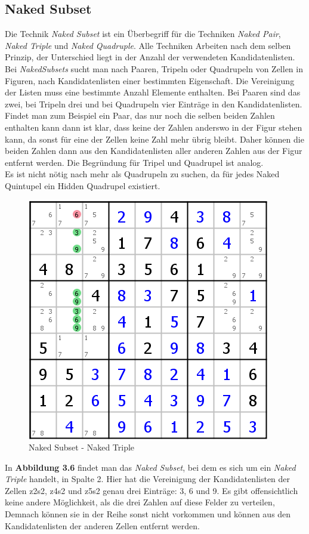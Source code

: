 \newpage
\subsection{Naked Subset}
Die Technik \textit{Naked Subset} ist ein Überbegriff für die Techniken \textit{Naked Pair}, \textit{Naked Triple} und \textit{Naked Quadruple}. Alle Techniken Arbeiten nach dem selben Prinzip, der Unterschied liegt in der Anzahl der verwendeten Kandidatenlisten. Bei \textit{NakedSubsets} sucht man nach Paaren, Tripeln oder Quadrupeln von Zellen in Figuren, nach Kandidatenlisten einer bestimmten Eigenschaft. Die Vereinigung der Listen muss eine bestimmte Anzahl Elemente enthalten. Bei Paaren sind das zwei, bei Tripeln drei und bei Quadrupeln vier Einträge in den Kandidatenlisten.\\
Findet man zum Beispiel ein Paar, das nur noch die selben beiden Zahlen enthalten kann dann ist klar, dass keine der Zahlen anderswo in der Figur stehen kann, da sonst für eine der Zellen keine Zahl mehr übrig bleibt. Daher können die beiden Zahlen dann aus den Kandidatenlisten aller anderen Zahlen aus der Figur entfernt werden.
Die Begründung für Tripel und Quadrupel ist analog.\\
Es ist nicht nötig nach mehr als Quadrupeln zu suchen, da für jedes Naked Quintupel ein Hidden Quadrupel existiert.

\begin{figure}[h]
\begin{center}
\includegraphics{./img/naked_subset.png}
\caption{Naked Subset - Naked Triple}
\end{center}
\end{figure}

In \textbf{Abbildung 3.6} findet man das \textit{Naked Subset}, bei dem es sich um ein \textit{Naked Triple} handelt, in Spalte 2. Hier hat die Vereinigung der Kandidatenlisten der Zellen z2s2, z4s2 und z5s2 genau drei Einträge: 3, 6 und 9. Es gibt offensichtlich keine andere Möglichkeit, als die drei Zahlen auf diese Felder zu verteilen, Demnach können sie in der Reihe sonst nicht vorkommen und können aus den Kandidatenlisten der anderen Zellen entfernt werden.
